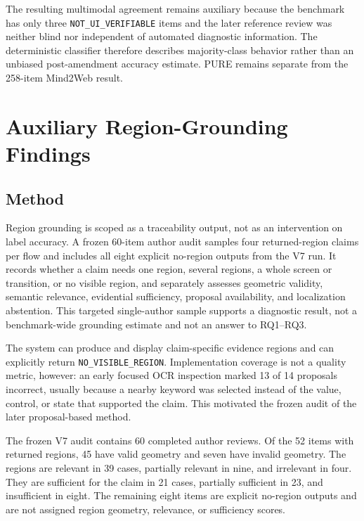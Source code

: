 The resulting multimodal agreement remains auxiliary because the benchmark has
only three \texttt{NOT\_UI\_VERIFIABLE} items and the later reference review was neither
blind nor independent of automated diagnostic information. The deterministic
classifier therefore describes majority-class behavior rather than an unbiased
post-amendment accuracy estimate. PURE remains separate from the 258-item
Mind2Web result.

\section{Auxiliary Region-Grounding Findings}\label{auxiliary-region-grounding-findings}

\subsection{Method}\label{method-1}

Region grounding is scoped as a traceability output, not as an intervention on
label accuracy. A frozen 60-item author audit samples four returned-region
claims per flow and includes all eight explicit no-region outputs from the V7
run. It records whether a claim needs one region, several regions, a whole
screen or transition, or no visible region, and separately assesses geometric
validity, semantic relevance, evidential sufficiency, proposal availability,
and localization abstention. This targeted single-author sample supports a
diagnostic result, not a benchmark-wide grounding estimate and not an answer to
RQ1--RQ3.

The system can produce and display claim-specific evidence regions and can
explicitly return \texttt{NO\_\allowbreak VISIBLE\_\allowbreak REGION}. Implementation coverage is not a quality
metric, however: an early focused OCR inspection marked 13 of 14 proposals
incorrect, usually because a nearby keyword was selected instead of the value,
control, or state that supported the claim. This motivated the frozen audit of
the later proposal-based method.

The frozen V7 audit contains 60 completed author reviews. Of the 52 items with
returned regions, 45 have valid geometry and seven have invalid geometry. The
regions are relevant in 39 cases, partially relevant in nine, and irrelevant in
four. They are sufficient for the claim in 21 cases, partially sufficient in
23, and insufficient in eight. The remaining eight items are explicit
no-region outputs and are not assigned region geometry, relevance, or
sufficiency scores.

